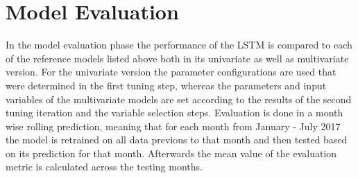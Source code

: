 \section{Model Evaluation}
In the model evaluation phase the performance of the LSTM is compared to each of the reference models listed above both in its univariate as well as multivariate version. For the univariate version the parameter configurations are used that were determined in the first tuning step, whereas the parameters and input variables of the multivariate models are set according to the results of the second tuning iteration and the variable selection steps. Evaluation is done in a month wise rolling prediction, meaning that for each month from January - July 2017 the model is retrained on all data previous to that month and then tested based on its prediction for that month. Afterwards the mean value of the evaluation metric is calculated across the testing months.
